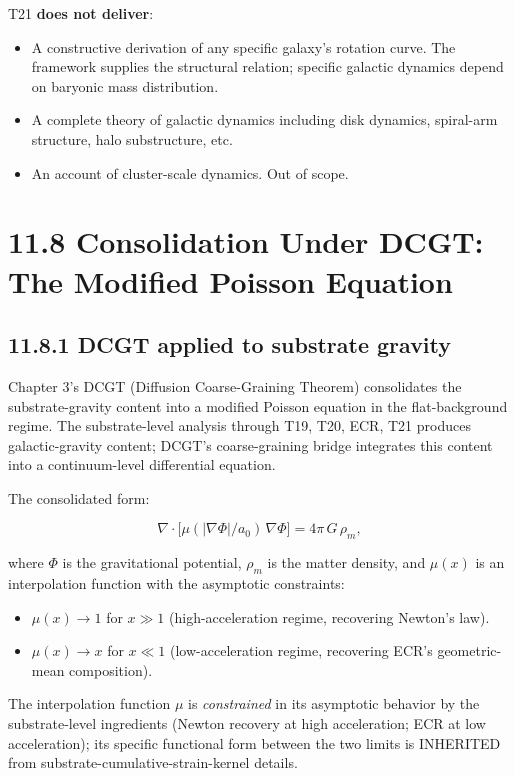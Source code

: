 \documentclass[11pt]{book}
\begin{document}
T21 \textbf{does not deliver}:
\begin{itemize}
\item A constructive derivation of any specific galaxy's rotation curve. The framework supplies the structural relation; specific galactic dynamics depend on baryonic mass distribution.
\item A complete theory of galactic dynamics including disk dynamics, spiral-arm structure, halo substructure, etc.
\item An account of cluster-scale dynamics. Out of scope.
\end{itemize}

\section{11.8 Consolidation Under DCGT: The Modified Poisson Equation}

\subsection{11.8.1 DCGT applied to substrate gravity}

Chapter 3's DCGT (Diffusion Coarse-Graining Theorem) consolidates the substrate-gravity content into a modified Poisson equation in the flat-background regime. The substrate-level analysis through T19, T20, ECR, T21 produces galactic-gravity content; DCGT's coarse-graining bridge integrates this content into a continuum-level differential equation.

The consolidated form:

\[
\nabla\cdot\bigl[\mu(|\nabla\Phi|/a_0)\,\nabla\Phi\bigr] = 4\pi\,G\,\rho_m,
\]

where $\Phi$ is the gravitational potential, $\rho_m$ is the matter density, and $\mu(x)$ is an interpolation function with the asymptotic constraints:
\begin{itemize}
\item $\mu(x) \to 1$ for $x \gg 1$ (high-acceleration regime, recovering Newton's law).
\item $\mu(x) \to x$ for $x \ll 1$ (low-acceleration regime, recovering ECR's geometric-mean composition).
\end{itemize}

The interpolation function $\mu$ is \textit{constrained} in its asymptotic behavior by the substrate-level ingredients (Newton recovery at high acceleration; ECR at low acceleration); its specific functional form between the two limits is INHERITED from substrate-cumulative-strain-kernel details.
\end{document}

